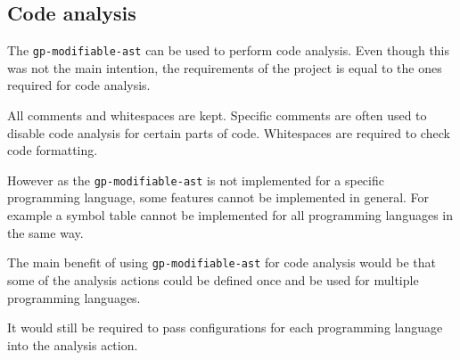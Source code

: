 \subsection{Code analysis}

The \verb|gp-modifiable-ast| can be used to perform code analysis. Even though this was not the main
intention, the requirements of the project is equal to the ones required for code analysis.

All comments and whitespaces are kept. 
Specific comments are often used to disable code analysis for certain parts of code.
Whitespaces are required to check code formatting.

However as the  \verb|gp-modifiable-ast| is not implemented for a specific programming language,
some features cannot be implemented in general. For example a symbol table cannot be implemented
for all programming languages in the same way.

The main benefit of using  \verb|gp-modifiable-ast| for code analysis would be that some of the analysis actions
could be defined once and be used for multiple programming languages.

It would still be required to pass configurations for each programming language into the analysis action.